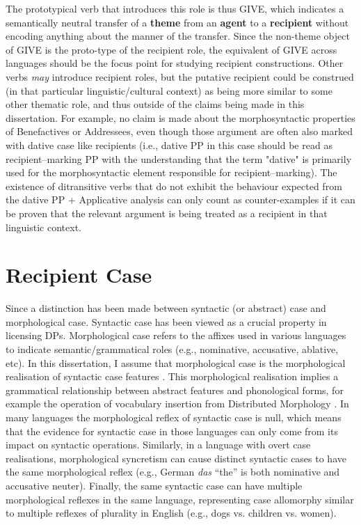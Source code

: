 The prototypical verb that introduces this role is thus GIVE, which indicates a semantically neutral transfer of a \textbf{theme} from an \textbf{agent} to a \textbf{recipient} without encoding anything about the manner of the transfer. Since the non-theme object of GIVE is the proto-type of the recipient role, the equivalent of GIVE across languages should be the focus point for studying recipient constructions. Other verbs \textit{may} introduce recipient roles, but the putative recipient could be construed (in that particular linguistic/cultural context) as being more similar to some other thematic role, and thus outside of the claims being made in this dissertation. For example, no claim is made about the morphosyntactic properties of Benefactives or Addressees, even though those argument are often also marked with dative case like recipients (i.e., dative PP in this case should be read as recipient--marking PP with the understanding that the term "dative" is primarily used for the morphosyntactic element responsible for recipient--marking). The existence of ditransitive verbs that do not exhibit the behaviour expected from the dative PP + Applicative analysis can only count as counter-examples if it can be proven that the relevant argument is being treated as a recipient in that linguistic context.

\section{Recipient Case}
Since \cite{Vergnaud.1977} a distinction has been made between syntactic (or abstract) case and morphological case. Syntactic case has been viewed as a crucial property in licensing DPs. Morphological case refers to the affixes used in various languages to indicate semantic/grammatical roles (e.g., nominative, accusative, ablative, etc). In this dissertation, I assume that morphological case is the morphological realisation of syntactic case features \citep{Legate.2008}. This morphological realisation implies a grammatical relationship between abstract features and phonological forms, for example the operation of vocabulary insertion from Distributed Morphology \citep{Halle.1993}. In many languages the morphological reflex of syntactic case is null, which means that the evidence for syntactic case in those languages can only come from its impact on syntactic operations. Similarly, in a language with overt case realisations, morphological syncretism can cause distinct syntactic cases to have the same morphological reflex (e.g., German \textit{das} ``the'' is both nominative and accusative neuter). Finally, the same syntactic case can have multiple morphological reflexes in the same language, representing case allomorphy similar to multiple reflexes of plurality in English (e.g., dogs vs. children vs. women).

